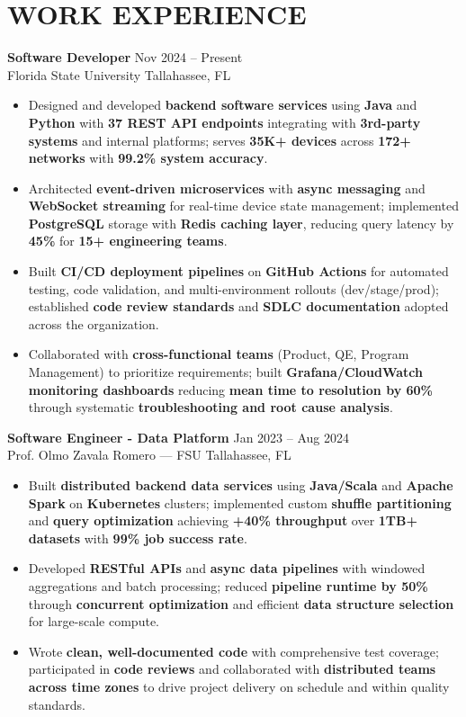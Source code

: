 \documentclass[letterpaper,10pt]{article}
\newcommand{\resumeItem}[1]{\item\small #1}
\newcommand{\resumeSubheading}[4]{
  \vspace{6pt}
  \noindent
  \textbf{#1} \hfill {\footnotesize #2} \\
  [-1pt]
  \noindent
  \small #3 \hfill {\small #4}
  \vspace{3pt}
}
\newcommand{\resumeItemsStart}{\vspace{-2pt}\begin{itemize}}
\newcommand{\resumeItemsEnd}{\end{itemize}\vspace{6pt}}
\begin{document}
\section{\textcolor{metablue}{WORK EXPERIENCE}}
\vspace{-12pt}

\resumeSubheading
{Software Developer}{Nov 2024 -- Present}
{Florida State University}{Tallahassee, FL}
\resumeItemsStart
\resumeItem{Designed and developed \textbf{backend software services} using \textbf{Java} and \textbf{Python} with \textbf{37 REST API endpoints} integrating with \textbf{3rd-party systems} and internal platforms; serves \textbf{35K+ devices} across \textbf{172+ networks} with \textbf{99.2\% system accuracy}.}
\resumeItem{Architected \textbf{event-driven microservices} with \textbf{async messaging} and \textbf{WebSocket streaming} for real-time device state management; implemented \textbf{PostgreSQL} storage with \textbf{Redis caching layer}, reducing query latency by \textbf{45\%} for \textbf{15+ engineering teams}.}
\resumeItem{Built \textbf{CI/CD deployment pipelines} on \textbf{GitHub Actions} for automated testing, code validation, and multi-environment rollouts (dev/stage/prod); established \textbf{code review standards} and \textbf{SDLC documentation} adopted across the organization.}
\resumeItem{Collaborated with \textbf{cross-functional teams} (Product, QE, Program Management) to prioritize requirements; built \textbf{Grafana/CloudWatch monitoring dashboards} reducing \textbf{mean time to resolution by 60\%} through systematic \textbf{troubleshooting and root cause analysis}.}
\resumeItemsEnd
\vspace{-12pt}

\resumeSubheading
{Software Engineer - Data Platform}{Jan 2023 -- Aug 2024}
{Prof. Olmo Zavala Romero — FSU}{Tallahassee, FL}
\resumeItemsStart
\resumeItem{Built \textbf{distributed backend data services} using \textbf{Java/Scala} and \textbf{Apache Spark} on \textbf{Kubernetes} clusters; implemented custom \textbf{shuffle partitioning} and \textbf{query optimization} achieving \textbf{+40\% throughput} over \textbf{1TB+ datasets} with \textbf{99\% job success rate}.}
\resumeItem{Developed \textbf{RESTful APIs} and \textbf{async data pipelines} with windowed aggregations and batch processing; reduced \textbf{pipeline runtime by 50\%} through \textbf{concurrent optimization} and efficient \textbf{data structure selection} for large-scale compute.}
\resumeItem{Wrote \textbf{clean, well-documented code} with comprehensive test coverage; participated in \textbf{code reviews} and collaborated with \textbf{distributed teams across time zones} to drive project delivery on schedule and within quality standards.}
\resumeItemsEnd
\vspace{-12pt}
\end{document}
